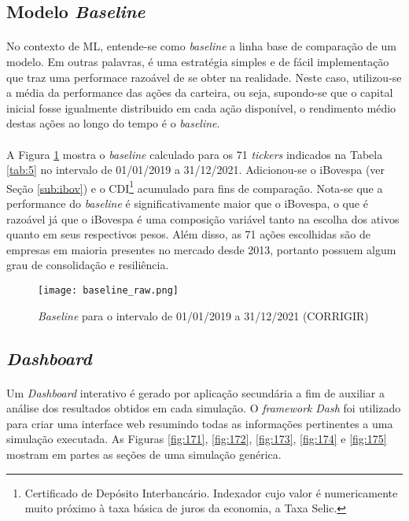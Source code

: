 \subsection{Modelo \textit{Baseline}}
\label{sub:baseline}

\paragraph{} No contexto de ML, entende-se como \textit{baseline} a linha base de comparação de um modelo. Em outras palavras, é uma estratégia simples e de fácil implementação que traz uma performace razoável de se obter na realidade. Neste caso, utilizou-se a média da performance das ações da carteira, ou seja, supondo-se que o capital inicial fosse igualmente distribuido em cada ação disponível, o rendimento médio destas ações ao longo do tempo é o \textit{baseline}.

\paragraph{} A Figura \ref{fig:170} mostra o \textit{baseline} calculado para os 71 \textit{tickers} indicados na Tabela \ref{tab:5} no intervalo de 01/01/2019 a 31/12/2021. Adicionou-se o iBovespa (ver Seção \ref{sub:ibov}) e o CDI\footnote{Certificado de Depósito Interbancário. Indexador cujo valor é numericamente muito próximo à taxa básica de juros da economia, a Taxa Selic.} acumulado para fins de comparação. Nota-se que a performance do \textit{baseline} é significativamente maior que o iBovespa, o que é razoável já que o iBovespa é uma composição variável tanto na escolha dos ativos quanto em seus respectivos pesos. Além disso, as 71 ações escolhidas são de empresas em maioria presentes no mercado desde 2013, portanto possuem algum grau de consolidação e resiliência.

\begin{figure}[h]
    \texttt{[image: baseline\_raw.png]}
    \centering
    \caption{\textit{Baseline} para o intervalo de 01/01/2019 a 31/12/2021 (CORRIGIR)}
    \label{fig:170}
\end{figure}

\subsection{\textit{Dashboard}}

\paragraph{} Um \textit{Dashboard} interativo é gerado por aplicação secundária a fim de auxiliar a análise dos resultados obtidos em cada simulação. O \textit{framework} \textit{Dash} \cite{dash} foi utilizado para criar uma interface web resumindo todas as informações pertinentes a uma simulação executada. As Figuras \ref{fig:171}, \ref{fig:172}, \ref{fig:173}, \ref{fig:174} e \ref{fig:175} mostram em partes as seções de uma simulação genérica.

